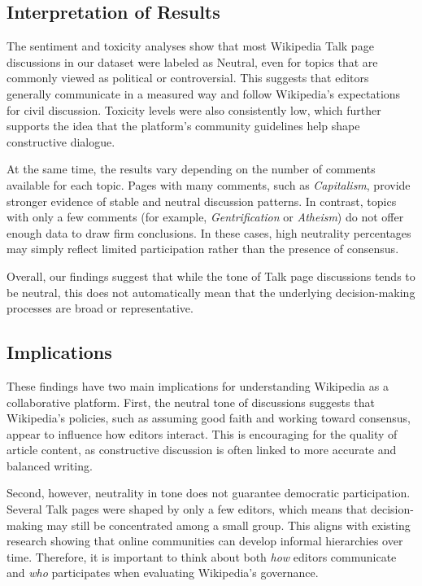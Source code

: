 
\label{sec:discussion}

\subsection{Interpretation of Results}
The sentiment and toxicity analyses show that most Wikipedia Talk
page discussions in our dataset were labeled as Neutral, even for
topics that are commonly viewed as political or controversial. This
suggests that editors generally communicate in a measured way and
follow Wikipedia’s expectations for civil discussion. Toxicity levels
were also consistently low, which further supports the idea that the
platform’s community guidelines help shape constructive dialogue.

At the same time, the results vary depending on the number of
comments available for each topic. Pages with many comments,
such as \emph{Capitalism}, provide stronger evidence of stable and
neutral discussion patterns. In contrast, topics with only a few
comments (for example, \emph{Gentrification} or \emph{Atheism})
do not offer enough data to draw firm conclusions. In these cases,
high neutrality percentages may simply reflect limited participation
rather than the presence of consensus.

Overall, our findings suggest that while the tone of Talk page
discussions tends to be neutral, this does not automatically mean
that the underlying decision-making processes are broad or
representative.

\subsection{Implications}
These findings have two main implications for understanding 
Wikipedia as a collaborative platform. First, the neutral tone of
discussions suggests that Wikipedia’s policies, such as assuming
good faith and working toward consensus, appear to influence how
editors interact. This is encouraging for the quality of article
content, as constructive discussion is often linked to more accurate
and balanced writing.

Second, however, neutrality in tone does not guarantee democratic
participation. Several Talk pages were shaped by only a few editors,
which means that decision-making may still be concentrated among
a small group. This aligns with existing research showing that
online communities can develop informal hierarchies over time.
Therefore, it is important to think about both \emph{how} editors
communicate and \emph{who} participates when evaluating Wikipedia’s
governance.

